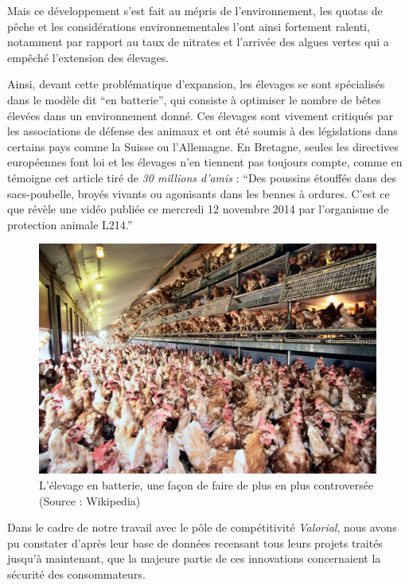 \documentclass[a4paper,12pt]{report}
\begin{document}
			Mais ce développement s’est fait au mépris de l’environnement, les quotas de pêche et les considérations environnementales l'ont ainsi fortement ralenti, notamment par rapport au taux de nitrates et l’arrivée des algues vertes qui a empêché l’extension des élevages.
			
			Ainsi, devant cette problématique d’expansion, les élevages se sont spécialisés dans le modèle dit “en batterie”, qui consiste à optimiser le nombre de bêtes élevées dans un environnement donné. Ces élevages sont vivement critiqués par les associations de défense des animaux  et ont été soumis à des législations dans certains pays comme la Suisse ou l’Allemagne. En Bretagne, seules les directives européennes font loi et les élevages n’en tiennent pas toujours compte, comme en témoigne cet article tiré de \textit{30 millions d’amis}\cite{BretagnePoussinsBroyesEtouffesDansCouvoir} : “Des poussins étouffés dans des sacs-poubelle, broyés vivants ou agonisants dans les bennes à ordures. C'est ce que révèle une vidéo publiée ce mercredi 12 novembre 2014 par l’organisme de protection animale L214.”
			
			\begin{figure}[!h]
			\centering
			\includegraphics[scale=0.75]{Illustrations/PouleBatterie.jpg}
			\caption{L'élevage en batterie, une façon de faire de plus en plus controversée\\(Source : Wikipedia)}
			\label{PouleBatterie}
			\end{figure}
			
			Dans le cadre de notre travail avec le pôle de compétitivité \textit{Valorial}, nous avons pu constater d’après leur base de données recensant tous leurs projets traités jusqu’à maintenant, que la majeure partie de ces innovations concernaient la sécurité des consommateurs. 
			
\end{document}
